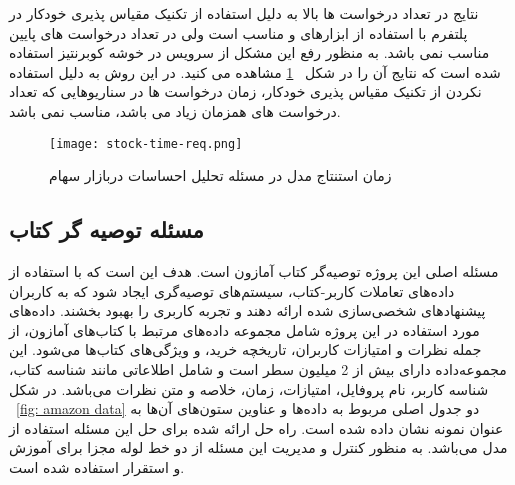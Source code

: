 نتایج در تعداد درخواست ها بالا به دلیل استفاده از تکنیک مقیاس پذیری خودکار در پلتفرم با استفاده از ابزارهای  و  مناسب است ولی در تعداد درخواست های پایین مناسب نمی باشد. به منظور رفع این مشکل از سرویس  در خوشه کوبرنتیز استفاده شده است که نتایج آن را در شکل 
~\ref{fig: stock time request}
مشاهده می کنید. در این روش به دلیل استفاده نکردن از تکنیک مقیاس پذیری خودکار،‌ زمان درخواست ها در سناریوهایی که تعداد درخواست های همزمان زیاد می باشد، مناسب نمی باشد.

\begin{figure}[t]
	\centering
	\texttt{[image: stock-time-req.png]}
	\caption{زمان استنتاج مدل در مسئله تحلیل احساسات دربازار سهام}
	\label{fig: stock time request}
\end{figure}


\subsection{مسئله توصیه گر کتاب}


مسئله اصلی این پروژه توصیه‌گر کتاب آمازون است. هدف این است که با استفاده از داده‌های تعاملات کاربر-کتاب، سیستم‌های توصیه‌گری ایجاد شود که به کاربران پیشنهادهای شخصی‌سازی شده ارائه دهند و تجربه کاربری را بهبود بخشند. داده‌های مورد استفاده در این پروژه شامل مجموعه داده‌های مرتبط با کتاب‌های آمازون، از جمله نظرات و امتیازات کاربران، تاریخچه خرید، و ویژگی‌های کتاب‌ها می‌شود. این مجموعه‌داده دارای بیش از 2 میلیون سطر است و شامل اطلاعاتی مانند شناسه کتاب، شناسه کاربر، نام پروفایل، امتیازات، زمان، خلاصه و متن نظرات می‌باشد. در شکل ~\ref{fig: amazon data} دو جدول اصلی مربوط به داده‌ها و عناوین ستون‌های آن‌ها به عنوان نمونه نشان داده شده است. راه حل ارائه شده برای حل این مسئله استفاده از مدل  می‌باشد. به منظور کنترل و مدیریت این مسئله از دو خط لوله مجزا برای آموزش و استقرار استفاده شده است.

